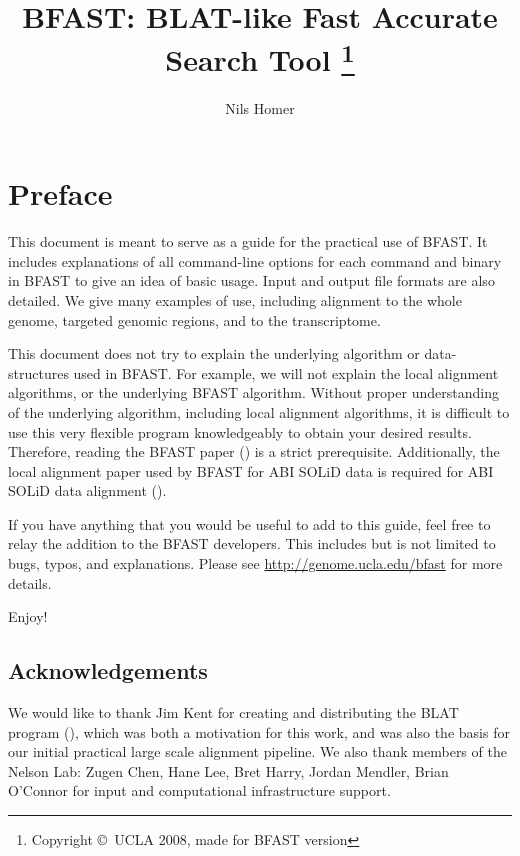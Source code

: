 \documentclass[a4paper,12pt]{book}
\author{Nils Homer}
\date{}
\title{BFAST: BLAT-like Fast Accurate Search Tool
\thanks{Copyright \copyright\ UCLA 2008, made for BFAST version \Version}
}
\begin{document}
\frontmatter

\maketitle

\tableofcontents
{}

\listoffigures
{}
\listoftables
{}

\chapter{Preface}
This document is meant to serve as a guide for the practical use of BFAST.
It includes explanations of all command-line options for each command and binary in BFAST to give an idea of basic usage.
Input and output file formats are also detailed.
We give many examples of use, including alignment to the whole genome, targeted genomic regions, and to the transcriptome.

This document does not try to explain the underlying algorithm or data-structures used in BFAST.
For example, we will not explain the local alignment algorithms, or the underlying BFAST algorithm.
Without proper understanding of the underlying algorithm, including local alignment algorithms, it is difficult to use this very flexible program knowledgeably to obtain your desired results.
Therefore, reading the BFAST paper (\cite{BFAST}) is a strict prerequisite.
Additionally, the local alignment paper used by BFAST for ABI SOLiD data is required for ABI SOLiD data alignment (\cite{BFAST-local-alignment}).

If you have anything that you would be useful to add to this guide, feel free to relay the addition to the BFAST developers.
This includes but is not limited to bugs, typos, and explanations.
Please see \url{http://genome.ucla.edu/bfast} for more details.

Enjoy!

\section{Acknowledgements}
We would like to thank Jim Kent for creating and distributing the BLAT program (\cite{BLAT}), which was both a motivation for this work, and was also the basis for our initial practical large scale alignment pipeline.
We also thank members of the Nelson Lab: Zugen Chen, Hane Lee, Bret Harry, Jordan Mendler, Brian O’Connor for input and computational infrastructure support.
\end{document}
